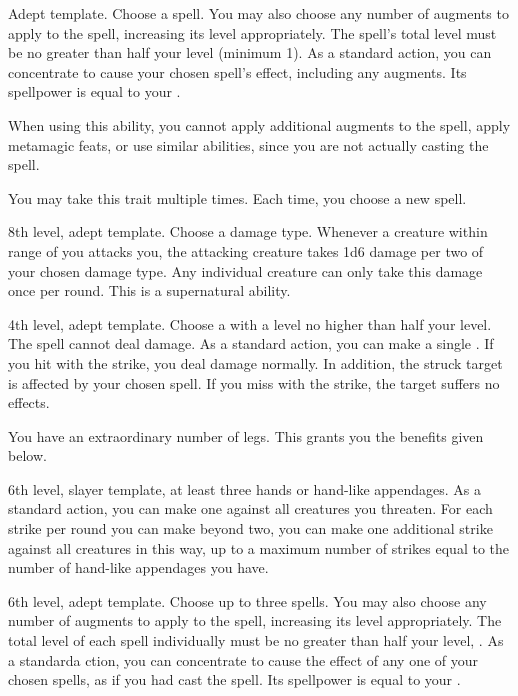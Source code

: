     \featpre Adept template.
     Choose a spell.
    You may also choose any number of augments to apply to the spell, increasing its level appropriately.
    The spell's total level must be no greater than half your level (minimum 1).
    \featben As a standard action, you can concentrate to cause your chosen spell's effect, including any augments.
    Its spellpower is equal to your .

    When using this ability, you cannot apply additional augments to the spell, apply metamagic feats, or use similar abilities, since you are not actually casting the spell.

     You may take this trait multiple times.
    Each time, you choose a new spell.

    \featpre 8th level, adept template.
     Choose a damage type.
    \featben Whenever a creature within \rngmed range of you attacks you, the attacking creature takes 1d6 damage per two  of your chosen damage type.
    Any individual creature can only take this damage once per round.
    This is a supernatural ability.

    \featpre 4th level, adept template.
     Choose a  with a level no higher than half your level.
    The spell cannot deal damage.
    \featben As a standard action, you can make a single .
    If you hit with the strike, you deal damage normally.
    In addition, the struck target is affected by your chosen spell.
    If you miss with the strike, the target suffers no effects.

    \featben You have an extraordinary number of legs.
    This grants you the benefits given below.

    \featpres 6th level, slayer template, at least three hands or hand-like appendages.
    \featben As a standard action, you can make one  against all creatures you threaten.
    For each strike per round you can make beyond two, you can make one additional strike against all creatures in this way, up to a maximum number of strikes equal to the number of hand-like appendages you have.

    \featpre 6th level, adept template.
     Choose up to three spells.
    You may also choose any number of augments to apply to the spell, increasing its level appropriately.
    The total level of each spell individually must be no greater than half your level, .
    \featben As a standarda ction, you can concentrate to cause the effect of any one of your chosen spells, as if you had cast the spell.
    Its spellpower is equal to your .

